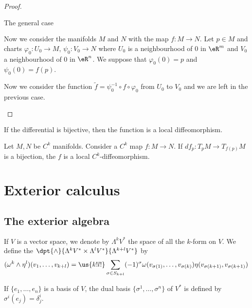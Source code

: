 \begin{proof}
\begin{subproof}
        \item[The general case]

            Now we consider the manifolds \( M\) and \( N\) with the map \( f\colon M\to N\). Let \( p\in M\) and charts \( \varphi_0\colon U_0\to M\), \( \psi_0\colon V_0\to N\) where \( U_0\) is a neighbourhood of \( 0\) in \( \eR^m\) and \( V_0\) a neighbourhood of \( 0\) in \( \eR^n\). We suppose that \( \varphi_0(0)=p\) and \( \psi_0(0)=f(p)\).

            Now we consider the function \( \tilde f=\psi_0^{-1}\circ f\circ \varphi_0\) from \( U_0\) to \( V_0\) and we are left in the previous case.
    \end{subproof}
\end{proof}

If the differential is bijective, then the function is a local diffeomorphism.
\begin{theorem}       \label{THOooDWEXooMClWVi}
    Let \( M,N\) be \( C^k\) manifolds. Consider a \( C^k\) map \( f\colon M\to N\). If \( df_p\colon T_pM\to T_{f(p)}M\) is a bijection, the \( f\) is a local \( C^k\)-diffeomorphism.
\end{theorem}


\section{Exterior calculus}

\subsection{The exterior algebra}

\begin{definition}
    If $V$ is a vector space, we denote by $\Lambda^kV^*$ the space of all the $k$-form on $V$. We define the  $\dpt{\wedge}{\Lambda^kV^*\times\Lambda^lV^*}{\Lambda^{k+l}V^*}$ by
    \begin{equation}
      (\omega^k\wedge\eta^l)(v_1,\ldots,v_{k+l})
      =\us{k!l!}\sum_{\sigma\in S_{k+l}} (-1)^{\sigma}   \omega(v_{\sigma(1)},\ldots,v_{\sigma(k)})\eta(v_{\sigma(k+1)},v_{\sigma(k+1)})
    \end{equation}
\end{definition}
If $\{e_1,\ldots,e_n\}$ is a basis of $V$, the dual basis $\{\sigma^1,\ldots,\sigma^n\}$ of $V^*$ is defined by $\sigma^i(e_j)=\delta^i_j$.

